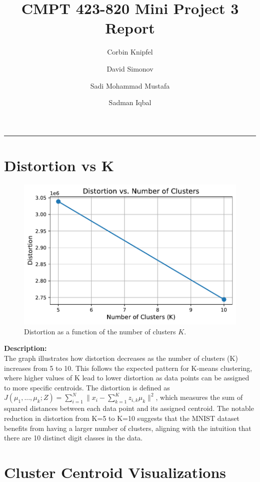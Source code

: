 \documentclass{article}
\title{CMPT 423-820 Mini Project 3 Report}
\author{Corbin Knipfel \and David Simonov \and Sadi Mohammad Mustafa \and Sadman Iqbal}
\date{}
\begin{document}
\maketitle
\hrule
\vspace{0.2in}
\section{Distortion vs K}
\begin{figure}[ht]
    \centering
    \includegraphics[width=0.8\linewidth]{figures/distortion_plot.pdf}
    \caption{Distortion as a function of the number of clusters \(K\).}
    \label{fig:distortion}
\end{figure}
\noindent
\textbf{Description:} \\
The graph illustrates how distortion decreases as the number of clusters (K) increases from 5 to 10. This follows the expected pattern for K-means clustering, where higher values of K lead to lower distortion as data points can be assigned to more specific centroids. The distortion is defined as $J(\mu_1, ...,\mu_k;Z) = \sum_{i=1}^{N} \|x_i - \sum_{k=1}^{K} z_{i,k}\mu_k\|^2$, which measures the sum of squared distances between each data point and its assigned centroid. The notable reduction in distortion from K=5 to K=10 suggests that the MNIST dataset benefits from having a larger number of clusters, aligning with the intuition that there are 10 distinct digit classes in the data.
\vspace{1.5em}
\section{Cluster Centroid Visualizations}
\end{document}
